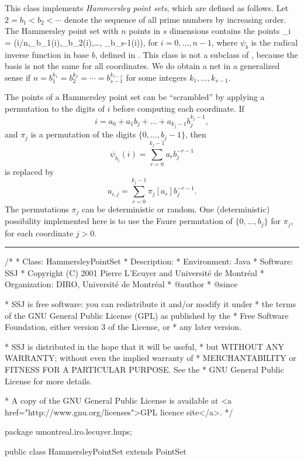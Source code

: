 
This class implements \emph{Hammersley point sets}, 
which are defined as follows.
Let $2 = b_1 < b_2 < \cdots$ denote the sequence of all prime 
numbers by increasing order.
The Hammersley point set with $n$ points in $s$ dimensions contains
the points
\eq
 _i = (i/n,\psi_{b_1}(i),\psi_{b_2}(i),\dots, \psi_{b_{s-1}}(i)),
\endeq
for $i=0,\dots,n-1$, where $\psi_b$ is the radical inverse function
in base $b$, defined in .
This class is not a subclass of , because the basis
is not the same for all coordinates.
We do obtain a net in a generalized sense if 
$n = b_1^{k_1} = b_2^{k_2} = \cdots = b_{s-1}^{k_{s-1}}$
for some integers $k_1,\dots,k_{s-1}$.

The points of a Hammersley point set can be ``scrambled'' by applying a 
permutation to the digits of $i$ before computing each coordinate.  If 
\[
  i = a_0 + a_1 b_j + \dots + a_{k_j-1} b_j^{k_j-1},
\]
and $\pi_j$ is a permutation of the digits $\{0,\dots,b_j-1\}$, then
\[
 \psi_{b_j}(i) = \sum_{r=0}^{k_j-1} a_r b_j^{-r-1} 
\]
is replaced  by
\[
 u_{i,j}= \sum_{r=0}^{k_j-1} \pi_j[a_r] b_j^{-r-1}.
\]
The permutations $\pi_j$ can be deterministic or random.
One (deterministic) possibility implemented here is to use
the Faure permutation of $\{0,\dots,b_j\}$ for $\pi_j$, for each 
coordinate $j > 0$.


\bigskip\hrule\bigskip

\begin{code}
\begin{hide}
/*
 * Class:        HammersleyPointSet
 * Description:  
 * Environment:  Java
 * Software:     SSJ 
 * Copyright (C) 2001  Pierre L'Ecuyer and Université de Montréal
 * Organization: DIRO, Université de Montréal
 * @author       
 * @since

 * SSJ is free software: you can redistribute it and/or modify it under
 * the terms of the GNU General Public License (GPL) as published by the
 * Free Software Foundation, either version 3 of the License, or
 * any later version.

 * SSJ is distributed in the hope that it will be useful,
 * but WITHOUT ANY WARRANTY; without even the implied warranty of
 * MERCHANTABILITY or FITNESS FOR A PARTICULAR PURPOSE.  See the
 * GNU General Public License for more details.

 * A copy of the GNU General Public License is available at
   <a href="http://www.gnu.org/licenses">GPL licence site</a>.
 */
\end{hide}
package umontreal.iro.lecuyer.hups;


public class HammersleyPointSet extends PointSet\begin{hide} {
   private int[] base;           // Vector of prime bases.
   private int[][] permutation;  // Digits permutation, for each dimension.
   private boolean permuted;     // Permute digits?
\end{hide}
\end{code}

